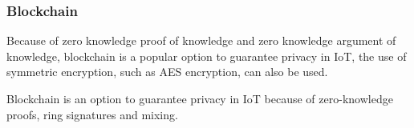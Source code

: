 \documentclass[conference]{IEEEtran}
\begin{document}



\subsubsection{Blockchain}

Because of zero knowledge proof of knowledge and zero knowledge argument of
knowledge, blockchain is a popular option to guarantee privacy in IoT, the
use of symmetric encryption, such as AES encryption, can also be used.




Blockchain is an option to guarantee privacy in IoT because of zero-knowledge proofs,
ring signatures and mixing.
\end{document}
